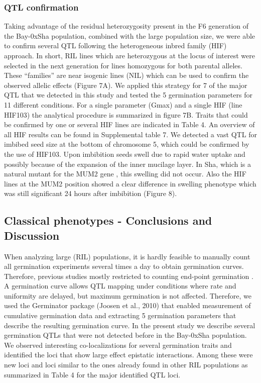 \documentclass[8pt, twoside, a5paper]{report}
\begin{document}
\subsubsection{QTL confirmation}
Taking advantage of the residual heterozygosity present in the F6 generation of the Bay-0xSha population, combined with the large population size, 
we were able to confirm several QTL following the heterogeneous inbred family (HIF) approach. In short, RIL lines which are heterozygous at the 
locus of interest were selected in the next generation for lines homozygous for both parental alleles. These “families” are near isogenic lines 
(NIL) which can be used to confirm the observed allelic effects (Figure 7A). We applied this strategy for 7 of the major QTL that we detected in 
this study and tested the 5 germination parameters for 11 different conditions. For a single parameter (Gmax) and a single HIF (line HIF103) the 
analytical procedure is summarized in figure 7B. Traits that could be confirmed by one or several HIF lines are indicated in Table 4. An overview
of all HIF results can be found in Supplemental table 7. We detected a vast QTL for imbibed seed size at the bottom of chromosome 5, which could 
be confirmed by the use of HIF103. Upon imbibition seeds swell due to rapid water uptake and possibly because of the expansion of the inner 
mucilage layer. In Sha, which is a natural mutant for the MUM2 gene \cite{Macquet:2007}, this swelling did not occur. Also the HIF lines at the
MUM2 position showed a clear difference in swelling phenotype which was still significant 24 hours after imbibition (Figure 8).

\subsection{Classical phenotypes - Conclusions and Discussion}
When analyzing large (RIL) populations, it is hardly feasible to manually count all germination experiments several times a day to obtain germination curves. Therefore,
previous studies mostly restricted to counting end-point germination \cite{Quesada:2002, Alonso-Blanco:2003, Clerkx:2004, Laserna:2008, Meng:2008, Bentsink:2010, Galpaz:2010, Vallejo:2010}. 
A germination curve allows QTL mapping under conditions where rate and uniformity are
delayed, but maximum germination is not affected. Therefore, we used the Germinator package (Joosen et al., 2010) that enabled measurement of cumulative germination data
and extracting 5 germination parameters that describe the resulting germination curve. In the present study we describe several germination QTLs that were not detected before in
the Bay-0xSha population. We observed interesting co-localizations for several germination traits and identified the loci that show large effect epistatic interactions.
Among these were new loci and loci similar to the ones already found in other RIL populations as summarized in Table 4 for the major identified QTL loci.
\end{document}
